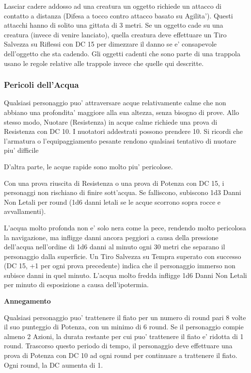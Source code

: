 \documentclass[a4paper,11pt,twoside,openany]{dndbook}
\begin{document}
{\begin{dndtable}
\end{dndtable}

\bigskip

Lasciar cadere addosso ad una creatura un oggetto richiede un attacco di contatto a distanza (Difesa a tocco contro attacco basato su Agilita'). Questi attacchi hanno di solito una gittata di 3 metri. Se un oggetto cade su una creatura (invece di venire lanciato), quella creatura deve effettuare un Tiro Salvezza su Riflessi con DC 15 per dimezzare il danno se e' consapevole dell'oggetto che sta cadendo. Gli oggetti cadenti che sono parte di una trappola usano le regole relative alle trappole invece che quelle qui descritte.

\subsubsection{Pericoli dell'Acqua}

\label{pericoli-dellacqua}

Qualsiasi personaggio puo' attraversare acque relativamente calme che non abbiano una profondita' maggiore alla sua altezza, senza bisogno di prove. Allo stesso modo, Nuotare (Resistenza) in acque calme richiede una prova di Resistenza con DC 10. I nuotatori addestrati possono prendere 10. Si ricordi che l'armatura o l'equipaggiamento pesante rendono qualsiasi tentativo di nuotare piu' difficile

D'altra parte, le acque rapide sono molto piu' pericolose.

Con una prova riuscita di Resistenza o una prova di Potenza con DC 15, i personaggi non rischiano di finire sott'acqua. Se falliscono, subiscono 1d3 Danni Non Letali per round (1d6 danni letali se le acque scorrono sopra rocce e avvallamenti).

L'acqua molto profonda non e' solo nera come la pece, rendendo molto pericolosa la navigazione, ma infligge danni ancora peggiori a causa della pressione dell'acqua nell'ordine di 1d6 danni al minuto ogni 30 metri che separano il personaggio dalla superficie. Un Tiro Salvezza su Tempra superato con successo (DC 15, +1 per ogni prova precedente) indica che il personaggio immerso non subisce danni in quel minuto. L'acqua molto fredda infligge 1d6 Danni Non Letali per minuto di esposizione a causa dell'ipotermia.

\textbf{Annegamento}

Qualsiasi personaggio puo' trattenere il fiato per un numero di round pari 8 volte il suo punteggio di Potenza, con un minimo di 6 round. Se il personaggio compie almeno 2 Azioni, la durata restante per cui puo' trattenere il fiato e' ridotta di 1 round. Trascorso questo periodo di tempo, il personaggio deve effettuare una prova di Potenza con DC 10 ad ogni round per continuare a trattenere il fiato. Ogni round, la DC aumenta di 1.

}
\end{document}

